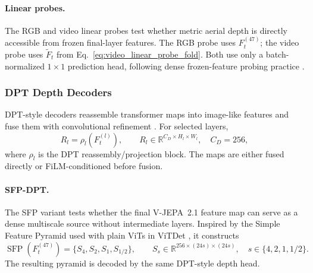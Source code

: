 \paragraph{Linear probes.}
The RGB and video linear probes test whether metric aerial depth is directly accessible from frozen final-layer features. The RGB probe uses $F_t^{(47)}$; the video probe uses $\widetilde{F}_t$ from Eq.~\eqref{eq:video_linear_probe_fold}. Both use only a batch-normalized $1\times1$ prediction head, following dense frozen-feature probing practice \cite{simeoni2025dinov3,facebookresearch_dinov3_linear_head}.

\subsubsection{DPT Depth Decoders}
\label{sec:method_dpt_decoders}

DPT-style decoders reassemble transformer maps into image-like features and fuse them with convolutional refinement \cite{ranftl2021dpt}. For selected layers,
\begin{equation}
    R_l = \rho_l\left(F_t^{(l)}\right),
    \qquad R_l\in\mathbb{R}^{C_D\times H_l\times W_l},
    \quad C_D=256,
    \label{eq:dpt_reassembly}
\end{equation}
where $\rho_l$ is the DPT reassembly/projection block. The maps are either fused directly or FiLM-conditioned before fusion.

\paragraph{SFP-DPT.}
The SFP variant tests whether the final V-JEPA~2.1 feature map can serve as a dense multiscale source without intermediate layers. Inspired by the Simple Feature Pyramid used with plain ViTs in ViTDet \cite{li2022vitdet}, it constructs
\begin{equation}
    \operatorname{SFP}(F_t^{(47)})=
    \{S_4,S_2,S_1,S_{1/2}\},
    \qquad
    S_s\in\mathbb{R}^{256\times(24s)\times(24s)},
    \quad s\in\{4,2,1,1/2\}.
    \label{eq:sfp}
\end{equation}
The resulting pyramid is decoded by the same DPT-style depth head.

